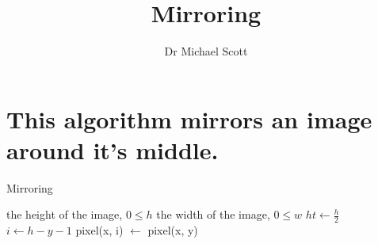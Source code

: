 \documentclass{../../../fal_assignment}
\title{Mirroring}
\author{Dr Michael Scott}
\begin{document}
\maketitle

	\section{This algorithm mirrors an image around it's middle.}
\begin{algorithm}[ht]
	\caption{Mirroring}
	\label{alg:algorithm}
	
	\begin{algorithmic}[1]
		\Require
		\Statex the height of the image, $0 \leq h$
		\Statex the width of the image, $0 \leq w$
		\State $ht \leftarrow \frac{h}{2}$
		\State $i \leftarrow h -  y - 1$
		\State pixel(x, i) $\leftarrow$ pixel(x, y)
		\EndFor
	\end{algorithmic}
\end{algorithm}
\end{document}

